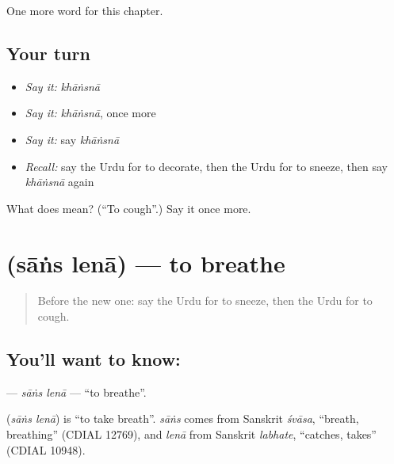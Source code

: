 \begin{grammarlens}[title={What you've built}]
One more word for this chapter.
\end{grammarlens}

\subsection*{Your turn}
\begin{itemize}
\raggedright
  \item \emph{Say it:} \emph{khāṅsnā}
  \item \emph{Say it:} \emph{khāṅsnā}, once more
  \item \emph{Say it:} say \emph{khāṅsnā}
  \item \emph{Recall:} say the Urdu for to decorate, then the Urdu for to sneeze, then say \emph{khāṅsnā} again
\end{itemize}

\begin{tcolorbox}[breakable,colback=teal!4,colframe=teal!35!black,title={Before you move on}]
What does  mean? (\textquotedblleft{}To cough\textquotedblright{}.) Say it once more.
\end{tcolorbox}
\section[\texorpdfstring{\ur{سانس} \ur{لینا} (sāṅs lenā)}{سانس لینا (sāṅs lenā)}]{  (sāṅs lenā) — to breathe}

\label{lesson:UR-C151-sans-lena}



\begin{quote}
Before the new one: say the Urdu for to sneeze, then the Urdu for to cough.
\end{quote}

\subsection*{You'll want to know:  }
\textbf{ } — \emph{sāṅs lenā} — \textquotedblleft{}to breathe\textquotedblright{}.

\begin{cousinweb}
\textbf{ } (\emph{sāṅs lenā}) is \textquotedblleft{}to take breath\textquotedblright{}. \emph{sāṅs} comes from Sanskrit \emph{śvāsa}, \textquotedblleft{}breath, breathing\textquotedblright{} (CDIAL 12769), and \emph{lenā} from Sanskrit \emph{labhate}, \textquotedblleft{}catches, takes\textquotedblright{} (CDIAL 10948).
\end{cousinweb}


